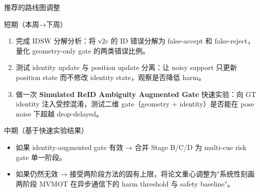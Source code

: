 \documentclass[aspectratio=169,xcolor=dvipsnames]{beamer}
\begin{document}
\begin{frame}{推荐的路线图调整}
\small
\begin{block}{短期（本周→下周）}
\begin{enumerate}
  \item 完成 IDSW 分解分析：将 v2c 的 ID 错误分解为 false-accept 和 false-reject，量化 geometry-only gate 的两类错误比例。
  \item 测试 identity update 与 position update 分离：让 noisy support 只更新 position state 而不修改 identity state，观察是否降低 harm。
  \item 做一次 \textbf{Simulated ReID Ambiguity Augmented Gate} 快速实验：向 GT identity 注入受控混淆，测试二维 gate（geometry + identity）是否能在 pose noise 下超越 drop-delayed。
\end{enumerate}
\end{block}

\begin{block}{中期（基于快速实验结果）}
\begin{itemize}
  \item 如果 identity-augmented gate 有效 → 合并 Stage B/C/D 为 multi-cue risk gate 单一阶段。
  \item 如果仍然无效 → 接受两阶段方法的固有上限，将论文重心调整为"系统性刻画两阶段 MVMOT 在异步通信下的 harm threshold 与 safety baseline"。
\end{itemize}
\end{block}
\end{frame}

\end{document}
